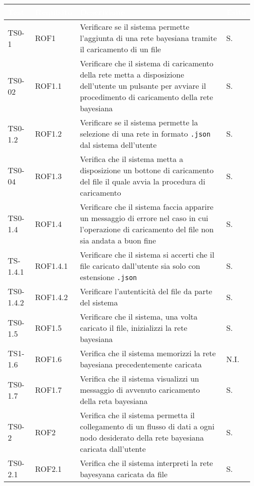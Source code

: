 \begin{longtable}{|C{.15\textwidth}|C{.14\textwidth}|m{.52\textwidth}|m{.08\textwidth}|}
\hline
{}\textbf{\textcolor{white}{Test}} & \textbf{\textcolor{white}{Requisito}} & \textbf{\textcolor{white}{Descrizione}} & \textbf{\textcolor{white}{Esito}}\\
\hline \hline
\endhead

TS0-1 & ROF1 & Verificare se il sistema permette l'aggiunta di una rete bayesiana tramite il caricamento di un file & S. \\
\hline
{} TS0-02 & ROF1.1 & Verificare che il sistema di caricamento della rete metta a disposizione dell'utente un pulsante per avviare il procedimento di caricamento della rete bayesiana & S.\\
\hline
TS0-1.2 & ROF1.2 & Verificare se il sistema permette la selezione di una rete in formato \texttt{.json} dal sistema dell'utente & S. \\
\hline
{} TS0-04 & ROF1.3 & Verifica che il sistema metta a disposizione un bottone di caricamento del file il quale avvia la procedura di caricamento & S. \\
\hline
TS0-1.4 &  ROF1.4 & Verificare che il sistema faccia apparire un messaggio di errore nel caso in cui l'operazione di caricamento del file non sia andata a buon fine & S. \\
\hline
{} TS-1.4.1 & ROF1.4.1 & Verificare che il sistema si accerti che il file caricato dall'utente sia solo con estensione \texttt{.json} & S. \\
\hline
TS0-1.4.2 & ROF1.4.2 & Verificare l'autenticità del file da parte del sistema & S. \\
\hline 
{} TS0-1.5  & ROF1.5 & Verificare che il sistema, una volta caricato il file, inizializzi la rete bayesiana & S. \\
\hline 
TS1-1.6 & ROF1.6 & Verifica che il sistema memorizzi la rete bayesiana precedentemente caricata & N.I. \\
\hline
{} TS0-1.7 & ROF1.7 & Verifica che il sistema visualizzi un messaggio di avvenuto caricamento della reta bayesiana & S. \\
\hline
TS0-2 & ROF2 & Verifica che il sistema permetta il collegamento di un flusso di dati a ogni nodo desiderato della rete bayesiana caricata dall'utente & S. \\
\hline
{} TS0-2.1 & ROF2.1 & Verifica che il sistema interpreti la rete bayesyana caricata da file & S. \\

\end{longtable}
